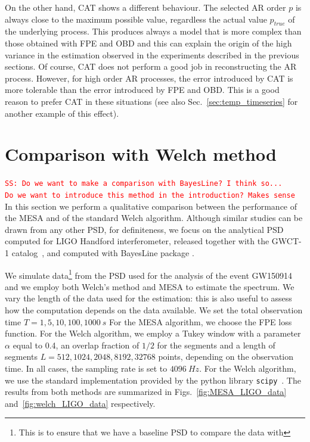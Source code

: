 \documentclass[twocolumn,showpacs,preprintnumbers,nofootinbib,prd,
superscriptaddress,10pt]{revtex4-1}
\newcommand{\sschmidt}[1]{{\textcolor{red}{\texttt{SS: #1}} }}
\begin{document}
On the other hand, CAT shows a different behaviour. The selected AR order $p$ is always close to the maximum possible value, regardless the actual value $p_{true}$ of the underlying process. This produces always a model that is more complex than those obtained with FPE and OBD and this can explain the origin of the high variance in the estimation observed in the experiments described in the previous sections.
Of course, CAT does not perform a good job in reconstructing the AR process. However, for high order AR processes, the error introduced by CAT is more tolerable than the error introduced by FPE and OBD. This is a good reason to prefer CAT in these situations (see also Sec.~\ref{sec:temp_timeseries} for another example of this effect).

\section{Comparison with Welch method}\label{sec:Welch_comparison}
\sschmidt{Do we want to make a comparison with BayesLine? I think so... \\ Do we want to introduce this method in the introduction? Makes sense}
In this section we perform a qualitative comparison between the performance of the MESA and of the standard Welch algorithm.
Although similar studies can be drawn from any other PSD, for definiteness, we focus on the analytical PSD computed for LIGO Handford interferometer, released together with the GWCT-1 catalog~\cite{GWTC1, PSD_release}, and computed with BayesLine package \cite{Cornish_2015, Littenberg_2015, Chatziioannou_2019}.

We simulate data\footnote{This is to ensure that we have a baseline PSD to compare the data with} from the PSD used for the analysis of the event GW150914 and we employ both Welch's method and MESA to estimate the spectrum.
We vary the length of the data used for the estimation: this is also useful to assess how the computation depends on the data available. We set the total observation time $T = 1, 5, 10, 100, 1000 \SI{}{s}$
For the MESA algorithm, we choose the FPE loss function. For the Welch algorithm, we employ a Tukey window with a parameter $\alpha$ 
equal to 0.4, an overlap fraction of $1/2$ for the segments and a length of 
segments $L = 512, 1024, 2048, 8192, 32768$ points, depending on the observation time.
In all cases, the sampling rate is set to $\SI{4096}{Hz}$.
For the Welch algorithm, we use the standard implementation provided by the python library \texttt{scipy}~\cite{numpy,scipy}.
The results from both methods are summarized in  Figs.~\ref{fig:MESA_LIGO_data} and~\ref{fig:welch_LIGO_data} respectively.
\end{document}
